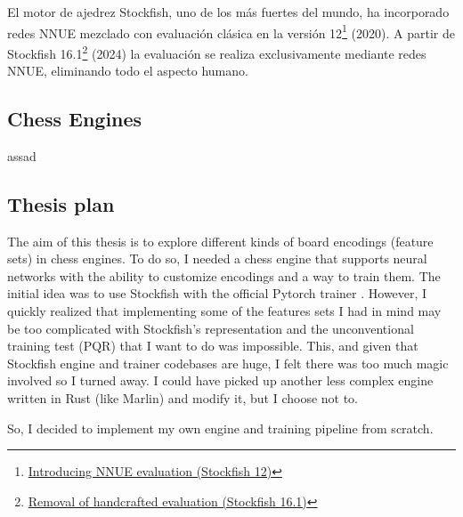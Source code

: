 El motor de ajedrez Stockfish, uno de los más fuertes del mundo, ha incorporado redes NNUE mezclado con evaluación clásica en la versión 12\footnote[1]{\href{https://stockfishchess.org/blog/2020/introducing-nnue-evaluation/}{Introducing NNUE evaluation (Stockfish 12)}} (2020). A partir de Stockfish 16.1\footnote[2]{\href{https://stockfishchess.org/blog/2024/stockfish-16-1/}{Removal of handcrafted evaluation (Stockfish 16.1)}} (2024) la evaluación se realiza exclusivamente mediante redes NNUE, eliminando todo el aspecto humano.

\subsection{Chess Engines}

assad

\subsection{Thesis plan}

The aim of this thesis is to explore different kinds of board encodings (feature sets) in chess engines. To do so, I needed a chess engine that supports neural networks with the ability to customize encodings and a way to train them. The initial idea was to use Stockfish with the official Pytorch trainer \cite{nnue-pytorch}. However, I quickly realized that implementing some of the features sets I had in mind may be too complicated  with Stockfish's representation and the unconventional training test (PQR) that I want to do was impossible. This, and given that Stockfish engine and trainer codebases are huge, I felt there was too much magic involved so I turned away. I could have picked up another less complex engine written in Rust (like Marlin) and modify it, but I choose not to.

So, I decided to implement my own engine and training pipeline from scratch.
